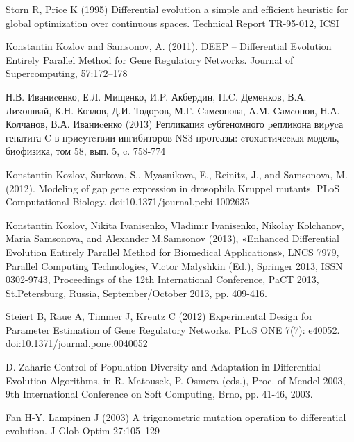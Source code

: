 
\begin{thebibliography}{20} %

	Storn R, Price K (1995) 
	Differential evolution a simple and efficient heuristic for global optimization over continuous spaces. Technical Report TR-95-012, ICSI
	
	Konstantin Kozlov and Samsonov, A. (2011). 
	DEEP – Differential Evolution Entirely Parallel Method for Gene Regulatory Networks. Journal of Supercomputing, 57:172–178
	
	Н.В. Иваниcенко, Е.Л. Мищенко, И.P. Акбеpдин, П.C. Деменков, В.А. Лиxошвай, К.Н. Козлов, Д.И. Тодоpов, М.Г. Cамcонова, А.М. Cамcонов, Н.А. Колчанов, В.А. Иваниcенко (2013) 
	Репликация cубгеномного pепликона виpуcа гепатита C в пpиcутcтвии ингибитоpов NS3-пpотеазы: cтоxаcтичеcкая модель, биофизика, том 58, вып. 5, c. 758-774

	Konstantin Kozlov, Surkova, S., Myasnikova, E., Reinitz, J., and Samsonova, M. (2012). 
	Modeling of gap gene expression in drosophila Kruppel mutants. PLoS Computational Biology. doi:10.1371/journal.pcbi.1002635

	Konstantin Kozlov, Nikita Ivanisenko, Vladimir Ivanisenko, Nikolay Kolchanov, Maria Samsonova, and Alexander M.Samsonov (2013), 
	«Enhanced Differential Evolution Entirely Parallel Method for Biomedical Applications», LNCS 7979, Parallel Computing Technologies, Victor Malyshkin (Ed.), 
	Springer 2013, ISSN 0302-9743, Proceedings of the 12th International Conference, PaCT 2013, St.Petersburg, Russia, September/October 2013, pp. 409-416.

	Steiert B, Raue A, Timmer J, Kreutz C (2012) 
	Experimental Design for Parameter Estimation of Gene Regulatory Networks. PLoS ONE 7(7): e40052. doi:10.1371/journal.pone.0040052
	
	D. Zaharie
	Control of Population Diversity and Adaptation in Differential Evolution Algorithms, 
	in R. Matousek, P. Osmera (eds.), Proc. of Mendel 2003, 9th International Conference on Soft Computing, Brno, pp. 41-46, 2003.
	
	Fan H-Y, Lampinen J (2003) 
	A trigonometric mutation operation to differential evolution. J Glob Optim 27:105–129

\end{thebibliography}
